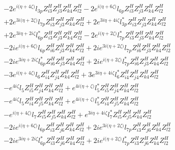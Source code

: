 \begin{align}
 &-2 e^{i \Big(\eta +4 \zeta \Big)} l_{3p} Z_{{i 3}}^{H} Z_{{j 3}}^{H} Z_{{k 4}}^{H} Z_{{l 2}}^{H} -2 e^{i \Big(\eta +6 \zeta \Big)} l_{6p} Z_{{i 3}}^{H} Z_{{j 3}}^{H} Z_{{k 4}}^{H} Z_{{l 2}}^{H} \nonumber \\ 
 &+2 e^{3 i \Big(\eta +2 \zeta \Big)} l_{7p} Z_{{i 3}}^{H} Z_{{j 3}}^{H} Z_{{k 4}}^{H} Z_{{l 2}}^{H} +2 e^{3 i \eta +4 i \zeta } l_{3p}^* Z_{{i 3}}^{H} Z_{{j 3}}^{H} Z_{{k 4}}^{H} Z_{{l 2}}^{H} \nonumber \\ 
 &+2 e^{3 i \eta +2 i \zeta } l_{6p}^* Z_{{i 3}}^{H} Z_{{j 3}}^{H} Z_{{k 4}}^{H} Z_{{l 2}}^{H} -2 e^{i \Big(\eta +2 \zeta \Big)} l_{7p}^* Z_{{i 3}}^{H} Z_{{j 3}}^{H} Z_{{k 4}}^{H} Z_{{l 2}}^{H} \nonumber \\ 
 &-2 i e^{i \Big(\eta +6 \zeta \Big)} l_{6p} Z_{{i 6}}^{H} Z_{{j 3}}^{H} Z_{{k 4}}^{H} Z_{{l 2}}^{H} +2 i e^{3 i \Big(\eta +2 \zeta \Big)} l_{7p} Z_{{i 6}}^{H} Z_{{j 3}}^{H} Z_{{k 4}}^{H} Z_{{l 2}}^{H} \nonumber \\ 
 &-2 i e^{3 i \eta +2 i \zeta } l_{6p}^* Z_{{i 6}}^{H} Z_{{j 3}}^{H} Z_{{k 4}}^{H} Z_{{l 2}}^{H} +2 i e^{i \Big(\eta +2 \zeta \Big)} l_{7p}^* Z_{{i 6}}^{H} Z_{{j 3}}^{H} Z_{{k 4}}^{H} Z_{{l 2}}^{H} \nonumber \\ 
 &-3 e^{i \Big(\eta +4 \zeta \Big)} l_6 Z_{{i 4}}^{H} Z_{{j 4}}^{H} Z_{{k 4}}^{H} Z_{{l 2}}^{H} +3 e^{3 i \eta +4 i \zeta } l_6^* Z_{{i 4}}^{H} Z_{{j 4}}^{H} Z_{{k 4}}^{H} Z_{{l 2}}^{H} \nonumber \\ 
 &- e^{4 i \zeta } l_5 Z_{{i 5}}^{H} Z_{{j 4}}^{H} Z_{{k 4}}^{H} Z_{{l 2}}^{H} +e^{4 i \Big(\eta +\zeta \Big)} l_5^* Z_{{i 5}}^{H} Z_{{j 4}}^{H} Z_{{k 4}}^{H} Z_{{l 2}}^{H} \nonumber \\ 
 &- e^{4 i \zeta } l_5 Z_{{i 4}}^{H} Z_{{j 5}}^{H} Z_{{k 4}}^{H} Z_{{l 2}}^{H} +e^{4 i \Big(\eta +\zeta \Big)} l_5^* Z_{{i 4}}^{H} Z_{{j 5}}^{H} Z_{{k 4}}^{H} Z_{{l 2}}^{H} \nonumber \\ 
 &- e^{i \Big(\eta +4 \zeta \Big)} l_7 Z_{{i 5}}^{H} Z_{{j 5}}^{H} Z_{{k 4}}^{H} Z_{{l 2}}^{H} +e^{3 i \eta +4 i \zeta } l_7^* Z_{{i 5}}^{H} Z_{{j 5}}^{H} Z_{{k 4}}^{H} Z_{{l 2}}^{H} \nonumber \\ 
 &-2 i e^{i \Big(\eta +6 \zeta \Big)} l_{6p} Z_{{i 3}}^{H} Z_{{j 6}}^{H} Z_{{k 4}}^{H} Z_{{l 2}}^{H} +2 i e^{3 i \Big(\eta +2 \zeta \Big)} l_{7p} Z_{{i 3}}^{H} Z_{{j 6}}^{H} Z_{{k 4}}^{H} Z_{{l 2}}^{H} \nonumber \\ 
 &-2 i e^{3 i \eta +2 i \zeta } l_{6p}^* Z_{{i 3}}^{H} Z_{{j 6}}^{H} Z_{{k 4}}^{H} Z_{{l 2}}^{H} +2 i e^{i \Big(\eta +2 \zeta \Big)} l_{7p}^* Z_{{i 3}}^{H} Z_{{j 6}}^{H} Z_{{k 4}}^{H} Z_{{l 2}}^{H} \nonumber \\ 

\end{align}
